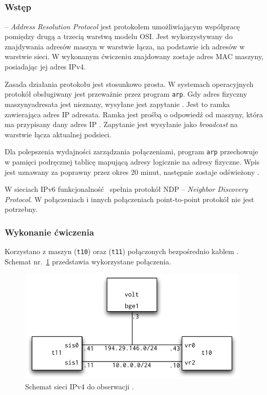 \subsection{\arp}


\subsubsection{Wstęp}

\arp{} -- \emph{Address Resolution Protocol} jest protokołem umożliwiającym
współpracę pomiędzy drugą a trzecią warstwą modelu OSI. Jest wykorzystywany do
znajdywania adresów maszyn w warstwie łącza, na podstawie ich adresów w warstwie
sieci. W wykonanym ćwiczeniu znajdowany zostaje adres MAC maszyny, posiadając
jej adres IPv4.

Zasada działania protokołu \arp{} jest stosunkowo prosta. W systemach
operacyjnych protokół obsługiwany jest przeważnie przez program \texttt{arp}.
Gdy adres fizyczny maszyny\dywiz adresata jest nieznany, wysyłane jest zapytanie
\arp. Jest to ramka \eth{} zawierająca adres IP adresata. Ramka jest prośbą o
odpowiedź od maszyny, która ma przypisany dany adres IP
\cite{arp:stevens-przyklad}. Zapytanie jest wysyłanie jako \emph{broadcast}
na warstwie łącza aktualnej podsieci.

Dla polepszenia wydajności zarządzania połączeniami, program \texttt{arp}
przechowuje w pamięci podręcznej tablicę mapującą adresy logicznie na adresy
fizyczne. Wpis jest uznawany za poprawny przez okres 20 minut, następnie zostaje
odświeżony \cite{arp:stevens-cache}.

W sieciach IPv6 funkcjonalność \arp{} spełnia protokół NDP -- \emph{Neighbor
Discovery Protocol}. W połączeniach \ppp{} i innych połączeniach point-to-point
protokół \arp{} nie jest potrzebny.


\subsubsection{Wykonanie ćwiczenia}

Korzystano z maszyn \tjz{} (\texttt{t10}) oraz \tjj{} (\texttt{t11}) połączonych
bezpośrednio kablem \eth. Schemat nr.~\ref{fig:arp:schemat-po-konfiguracji}
przedstawia wykorzystane połączenia.

\begin{figure}[h!]
  \centering
  \includegraphics[width=11cm]{figury/arp/schemat-po-konfiguracji.pdf}
  \caption{Schemat sieci IPv4 do obserwacji \arp.}
  \label{fig:arp:schemat-po-konfiguracji}
\end{figure}


